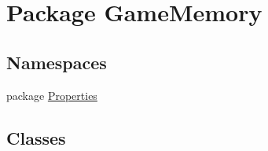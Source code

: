 \hypertarget{namespace_game_memory}{\section{Package Game\-Memory}
\label{namespace_game_memory}
}
\subsection*{Namespaces}
\begin{DoxyCompactItemize}
\item 
package \hyperlink{namespace_game_memory_1_1_properties}{Properties}
\end{DoxyCompactItemize}
\subsection*{Classes}
